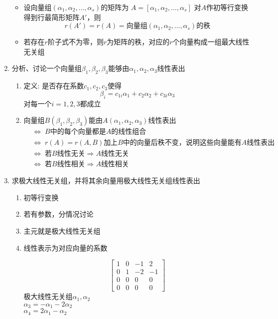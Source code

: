 \documentclass[a4paper,12pt]{article}
\begin{document}
\begin{enumerate}
\begin{itemize}
            \item 设向量组$(\alpha_1, \alpha_2, \dots, \alpha_s)$的矩阵为 $A = [\alpha_1, \alpha_2, \dots, \alpha_s]$ 对$A$作初等行变换得到行最简形矩阵$A'$，则
            \[
                r(A') = r(A) = \text{向量组}(\alpha_1, \alpha_2, \dots, \alpha_s)\text{的秩}
            \]
            \item 若存在$r$阶子式不为零，则$r$为矩阵的秩，对应的$r$个向量构成一组最大线性无关组
        \end{itemize}
        \item 分析、讨论一个向量组$\beta_1, \beta_2, \beta_3$能够由$\alpha_1, \alpha_2, \alpha_3$线性表出
        \begin{enumerate}
            \item 定义: 是否存在系数$c_1, c_2, c_3$使得
            \[
                \beta_i = c_{1i}\alpha_1 + c_{2}\alpha_2 + c_{3i}\alpha_3
            \]对每一个$i = 1, 2, 3$都成立
            \item 向量组$B(\beta_1, \beta_2, \beta_3)$能由$A(\alpha_1, \alpha_2, \alpha_3)$线性表出
            \begin{align*}
                &\Leftrightarrow\; B\text{中的每个向量都是}A\text{的线性组合} \\
                &\Leftrightarrow\; r(A) = r(A, B) \text{加上}B\text{中的向量后秩不变，说明这些向量能有}A\text{线性表出} \\
                &\Leftrightarrow\; \text{若}B\text{线性无关} \Rightarrow A\text{线性无关} \\
                &\Leftrightarrow\; \text{若}B\text{线性相关} \Rightarrow A\text{线性相关}
            \end{align*}
        \end{enumerate}
        \item 求极大线性无关组，并将其余向量用极大线性无关组线性表出
        \begin{enumerate}
            \item 初等行变换
            \item 若有参数，分情况讨论
            \item 主元就是极大线性无关组
            \item 线性表示为对应向量的系数
            \begin{analysisbox}[Case:]
                \[
                    \begin{bmatrix}
                        1 & 0 & -1 & 2  \\
                        0 & 1 & -2 & -1 \\
                        0 & 0 & 0  & 0  \\
                        0 & 0 & 0  & 0
                    \end{bmatrix}
                \]
                极大线性无关组$\alpha_1, \alpha_2$ \\
                $\alpha_3 = -\alpha_1 - 2\alpha_2$ \\
                $\alpha_4 = 2\alpha_1 - \alpha_2$
            \end{analysisbox}
        \end{enumerate}
    \end{enumerate}
\end{document}
